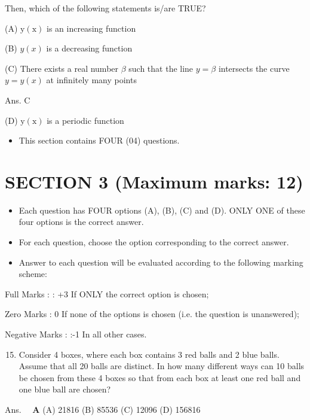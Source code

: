 \documentclass[10pt]{article}
\begin{document}
Then, which of the following statements is/are TRUE?

(A) $\mathrm{y}(\mathrm{x})$ is an increasing function

(B) $y(x)$ is a decreasing function

(C) There exists a real number $\beta$ such that the line $y=\beta$ intersects the curve $y=y(x)$ at infinitely many points

Ans. $\mathrm{C}$

(D) $\mathrm{y}(\mathrm{x})$ is a periodic function

\begin{itemize}
  \item This section contains FOUR (04) questions.
\end{itemize}

\section{SECTION 3 (Maximum marks: 12)}
\begin{itemize}
  \item Each question has FOUR options (A), (B), (C) and (D). ONLY ONE of these four options is the correct answer.

  \item For each question, choose the option corresponding to the correct answer.

  \item Answer to each question will be evaluated according to the following marking scheme:

\end{itemize}

Full Marks : : +3 If ONLY the correct option is chosen;

Zero Marks : 0 If none of the options is chosen (i.e. the question is unanswered);

Negative Marks : :-1 In all other cases.

\begin{enumerate}
  \setcounter{enumi}{14}
  \item Consider 4 boxes, where each box contains 3 red balls and 2 blue balls. Assume that all 20 balls are distinct. In how many different ways can 10 balls be chosen from these 4 boxes so that from each box at least one red ball and one blue ball are chosen?
\end{enumerate}

Ans. $\quad \mathbf{A}$
(A) 21816
(B) 85536
(C) 12096
(D) 156816
\end{document}
